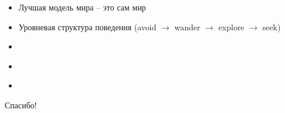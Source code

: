 \documentclass{beamer}
\begin{document}
\begin{frame}{}
\begin{itemize}
	\item Лучшая модель мира -- это сам мир
	\medskip
\end{itemize}
\end{frame}

\begin{frame}{}
\begin{itemize}
	\item Уровневая структура поведения (avoid $\to$ wander $\to$ explore $\to$ seek)
	\medskip
\end{itemize}
\end{frame}

\begin{frame}{}
\begin{itemize}
	\item 
	\medskip
\end{itemize}
\end{frame}

\begin{frame}{}
\begin{itemize}
	\item 
	\medskip
\end{itemize}
\end{frame}

\begin{frame}{}
\begin{itemize}
	\item 
	\medskip
\end{itemize}
\end{frame}




\begin{frame}{}
    \thispagestyle{empty}
    \begin{center}
        {\large Спасибо!}
    \end{center}
\end{frame}
\end{document}
